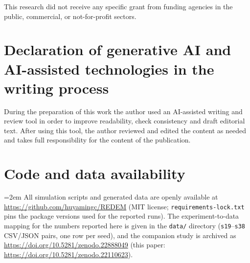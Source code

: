 \documentclass[preprint,12pt]{elsarticle}
\begin{document}
This research did not receive any specific grant from funding agencies in
the public, commercial, or not-for-profit sectors.

\section*{Declaration of generative AI and AI-assisted technologies in
the writing process}

During the preparation of this work the author used an AI-assisted
writing and review tool in order to improve readability, check
consistency and draft editorial text. After using this tool, the author
reviewed and edited the content as needed and takes full responsibility
for the content of the publication.

\section*{Code and data availability}

{\sloppy\emergencystretch=2em
All simulation scripts and generated data are openly available at
\url{https://github.com/huyamingc/REDEM} (MIT license;
\texttt{requirements-lock.txt} pins the package versions used for the
reported runs). The experiment-to-data mapping for the numbers
reported here is given in the \texttt{data/} directory
(\texttt{s19}--\texttt{s38} CSV/JSON pairs, one row per seed), and the
companion study \cite{redemf} is archived as
\url{https://doi.org/10.5281/zenodo.22888049} (this paper:
\url{https://doi.org/10.5281/zenodo.22110623}).\par}
\end{document}
